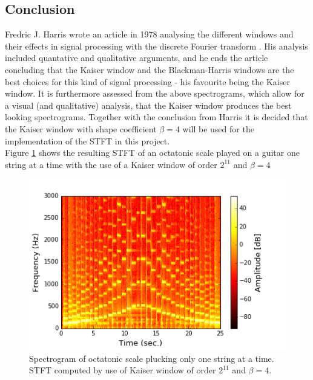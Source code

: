 \subsection{Conclusion}
Fredric J. Harris wrote an article in 1978 analysing the different windows and their effects in signal processing with the discrete Fourier transform \cite{fredric_harris}. His analysis included quantative and qualitative arguments, and he ends the article concluding that the Kaiser window and the Blackman-Harris windows are the best choices for this kind of signal processing - his favourite being the Kaiser window. It is furthermore assessed from the above spectrograms, which allow for a visual (and qualitative) analysis, that the Kaiser window produces the best looking spectrograms. Together with the conclusion from Harris it is decided that the Kaiser window with shape coefficient $\beta = 4$ will be used for the implementation of the STFT in this project. \\
Figure \ref{fig:STFT_test_signal} shows the resulting STFT of an octatonic scale played on a guitar one string at a time with the use of a Kaiser window of order $2^{11}$ and $\beta = 4$  
\begin{figure}[H]
\centering
\includegraphics[scale = 0.6]{figures/validation/stft/scale.png}
\caption{Spectrogram of octatonic scale plucking only one string at a time. STFT computed by use of Kaiser window of order $2^{11}$ and $\beta = 4$.}
\label{fig:STFT_test_signal}
\end{figure}